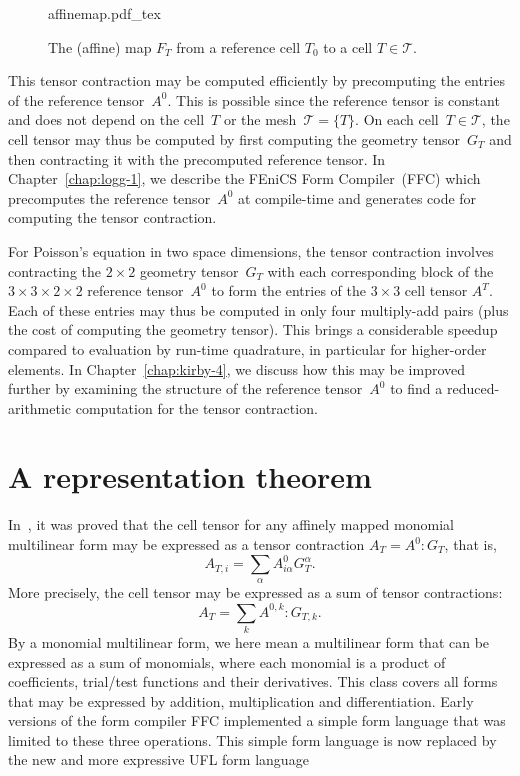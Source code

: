 \begin{figure}
  \begin{center}
    \def\svgwidth{\largefig}
    {affinemap.pdf_tex}
    \caption{The (affine) map $F_T$ from a reference cell $T_0$
      to a cell $T \in \mathcal{T}$.}
    \label{fig:affinemap}
  \end{center}
\end{figure}

This tensor contraction may be computed efficiently by precomputing
the entries of the reference tensor~$A^0$. This is possible since the
reference tensor is constant and does not depend on the cell~$T$ or
the mesh~$\mathcal{T} = \{T\}$. On each cell~$T \in \mathcal{T}$, the
cell tensor may thus be computed by first computing the geometry
tensor~$G_T$ and then contracting it with the precomputed reference
tensor. In Chapter~\ref{chap:logg-1}, we describe the FEniCS Form
Compiler~(FFC) which precomputes the reference tensor~$A^0$ at
compile-time and generates code for computing the tensor contraction.

For Poisson's equation in two space dimensions, the tensor contraction
involves contracting the $2 \times 2$ geometry tensor~$G_T$ with each
corresponding block of the $3 \times 3 \times 2 \times 2$ reference
tensor~$A^0$ to form the entries of the $3 \times 3$ cell tensor
$A^T$. Each of these entries may thus be computed in only four
multiply-add pairs (plus the cost of computing the geometry
tensor). This brings a considerable speedup compared to evaluation by
run-time quadrature, in particular for higher-order elements. In
Chapter~\ref{chap:kirby-4}, we discuss how this may be improved
further by examining the structure of the reference tensor~$A^0$ to
find a reduced-arithmetic computation for the tensor contraction.

\section{A representation theorem}

In~\cite{KirbyLogg2006}, it was proved that the cell tensor for any
affinely mapped monomial multilinear form may be expressed as a tensor
contraction $A_T = A^0 : G_T$, that is,
\begin{equation*}
  A_{T,i} = \sum_{\alpha} A^0_{i\alpha} G_T^{\alpha}.
\end{equation*}
More precisely, the cell tensor may be expressed as a sum of tensor
contractions:
\begin{equation} \label{eq:tensorcontraction}
  A_T = \sum_k A^{0,k} : G_{T,k}.
\end{equation}
By a monomial multilinear form, we here mean a multilinear form that
can be expressed as a sum of monomials, where each monomial is a
product of coefficients, trial/test functions and their derivatives.
This class covers all forms that may be expressed by addition,
multiplication and differentiation. Early versions of the form
compiler FFC implemented a simple form language that was limited to
these three operations. This simple form language is now replaced by
the new and more expressive UFL form language

